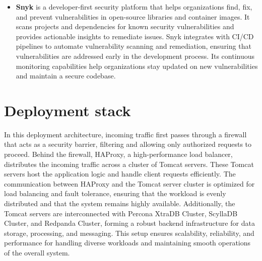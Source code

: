 \documentclass[12pt,a4paper,oneside]{report}
\begin{document}
\begin{itemize}
 
\item \textbf{Snyk} is a developer-first security platform that helps organizations find, fix, and prevent vulnerabilities in open-source libraries and container images. It scans projects and dependencies for known security vulnerabilities and provides actionable insights to remediate issues. Snyk integrates with CI/CD pipelines to automate vulnerability scanning and remediation, ensuring that vulnerabilities are addressed early in the development process. Its continuous monitoring capabilities help organizations stay updated on new vulnerabilities and maintain a secure codebase.
\end{itemize}

\section{Deployment stack}
\par In this deployment architecture, incoming traffic first passes through a firewall that acts as a security barrier, filtering and allowing only authorized requests to proceed. Behind the firewall, HAProxy, a high-performance load balancer, distributes the incoming traffic across a cluster of Tomcat servers. These Tomcat servers host the application logic and handle client requests efficiently. The communication between HAProxy and the Tomcat server cluster is optimized for load balancing and fault tolerance, ensuring that the workload is evenly distributed and that the system remains highly available. Additionally, the Tomcat servers are interconnected with Percona XtraDB Cluster, ScyllaDB Cluster, and Redpanda Cluster, forming a robust backend infrastructure for data storage, processing, and messaging. This setup ensures scalability, reliability, and performance for handling diverse workloads and maintaining smooth operations of the overall system.
\end{document}
